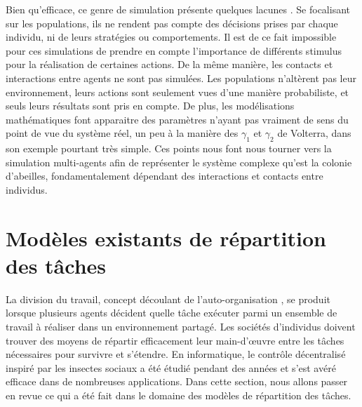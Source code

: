 		Bien qu'efficace, ce genre de simulation présente quelques lacunes \cite{drogoul_multi-agent_1992}. Se focalisant sur les populations, ils ne rendent pas compte des décisions prises par chaque individu, ni de leurs stratégies ou comportements. Il est de ce fait impossible pour ces simulations de prendre en compte l'importance de différents stimulus pour la réalisation de certaines actions. De la même manière, les contacts et interactions entre agents ne sont pas simulées. Les populations n'altèrent pas leur environnement, leurs actions sont seulement vues d'une manière probabiliste, et seuls leurs résultats sont pris en compte. De plus, les modélisations mathématiques font apparaitre des paramètres n'ayant pas vraiment de sens du point de vue du système réel, un peu à la manière des $\gamma_1$ et $\gamma_2$ de Volterra, dans son exemple pourtant très simple. Ces points nous font nous tourner vers la simulation multi-agents afin de représenter le système complexe qu'est la colonie d'abeilles, fondamentalement dépendant des interactions et contacts entre individus.
			
			
	\section{Modèles existants de répartition des tâches}
	La division du travail, concept découlant de l'auto-organisation \cite{labella_division_2006}, se produit lorsque plusieurs agents décident quelle tâche exécuter parmi un ensemble de travail à réaliser dans un environnement partagé. Les sociétés d'individus doivent trouver des moyens de répartir efficacement leur main-d'œuvre entre les tâches nécessaires pour survivre et s'étendre. En informatique, le contrôle décentralisé inspiré par les insectes sociaux a été étudié pendant des années et s'est avéré efficace dans de nombreuses applications. Dans cette section, nous allons passer en revue ce qui a été fait dans le domaine des modèles de répartition des tâches.
	
	
